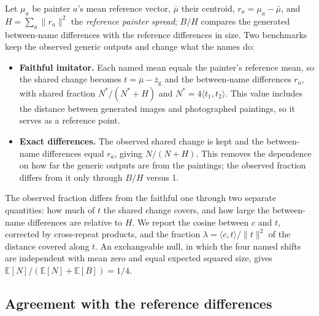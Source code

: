\documentclass[10pt]{article}
\newcommand{\ip}[2]{\langle #1,#2\rangle}
\begin{document}
Let $\mu_a$ be painter $a$'s mean reference vector, $\bar\mu$ their centroid, $r_a=\mu_a-\bar\mu$,
and $H=\sum_a\|r_a\|^2$ the \emph{reference painter spread}; $B/H$ compares the generated
between-name differences with the reference differences in size. Two benchmarks keep the observed
generic outputs and change what the names do:
\begin{itemize}
\item \textbf{Faithful imitator.} Each named mean equals the painter's reference mean, so the
shared change becomes $t=\bar\mu-\bar z_{\mathrm{g}}$ and the between-name differences $r_a$, with
shared fraction $N^*/(N^*+H)$ and $N^*=4\ip{t_1}{t_2}$. This value includes the distance between
generated images and photographed paintings, so it serves as a reference point.
\item \textbf{Exact differences.} The observed shared change is kept and the between-name
differences equal $r_a$, giving $N/(N+H)$. This removes the dependence on how far the generic
outputs are from the paintings; the observed fraction differs from it only through $B/H$
versus 1.
\end{itemize}
The observed fraction differs from the faithful one through two separate quantities: how much of
$t$ the shared change covers, and how large the between-name differences are relative to $H$.
We report the cosine between $c$ and $t$, corrected by cross-repeat products, and the fraction
$\lambda=\ip{c}{t}/\|t\|^2$ of the distance covered along $t$. An exchangeable null, in which the
four named shifts are independent with mean zero and equal expected squared size, gives
$\mathbb E[N]/(\mathbb E[N]+\mathbb E[B])=1/4$.

\subsection{Agreement with the reference differences}\label{sec:agreement-method}
\end{document}
